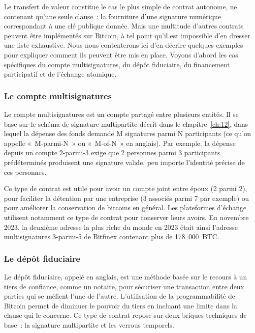 Le transfert de valeur constitue le cas le plus simple de contrat autonome, ne contenant qu'une seule clause~: la fourniture d'une signature numérique correspondant à une clé publique donnée. Mais une multitude d'autres contrats peuvent être implémentés sur Bitcoin, à tel point qu'il est impossible d'en dresser une liste exhaustive. Nous nous contenterons ici d'en décrire quelques exemples pour expliquer comment ils peuvent être mis en place. Voyons d'abord les cas spécifiques du compte multisignatures, du dépôt fiduciaire, du financement participatif et de l'échange atomique.


\subsubsection*{Le compte multisignatures} Le compte multisignatures est un compte partagé entre plusieurs entités. Il se base sur le schéma de signature multipartite décrit dans le chapitre~\ref{ch:12}, dans lequel la dépense des fonds demande M signatures parmi N participants (ce qu'on appelle «~M-parmi-N~» ou «~M-of-N~» en anglais). Par exemple, la dépense depuis un compte 2-parmi-3 exige que 2 personnes parmi 3 participants prédéterminés produisent une signature valide, peu importe l'identité précise de ces personnes.

Ce type de contrat est utile pour avoir un compte joint entre époux (2 parmi 2), pour faciliter la détention par une entreprise (3 associés parmi 7 par exemple) ou pour améliorer la conservation de bitcoins en général. Les plateformes d'échange utilisent notamment ce type de contrat pour conserver leurs avoirs. En novembre 2023, la deuxième adresse la plus riche du monde en 2023 était ainsi l'adresse multisignatures 3-parmi-5 de Bitfinex contenant plus de 178~000~BTC.


\subsubsection*{Le dépôt fiduciaire} Le dépôt fiduciaire, appelé  en anglais, est une méthode basée sur le recours à un tiers de confiance, comme un notaire, pour sécuriser une transaction entre deux parties qui se méfient l'une de l'autre. L'utilisation de la programmabilité de Bitcoin permet de diminuer le pouvoir du tiers en incluant une limite dans la clause qui le concerne. Ce type de contrat repose sur deux briques techniques de base~: la signature multipartite et les verrous temporels.

